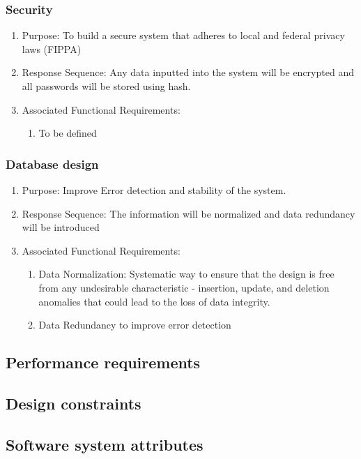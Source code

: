 \documentclass{journal}
\begin{document}
\begin{description}[style=multiline,leftmargin=3cm,font=\normalfont]
\subsubsection{Security}
\begin{enumerate}
\item Purpose: To build a secure system that adheres to local and federal privacy laws (FIPPA)
\item Response Sequence: Any data inputted into the system will be encrypted and all passwords will be stored using hash.
\item Associated Functional Requirements:
\begin{enumerate}
\item To be defined
\end{enumerate}
\end{enumerate}


\subsubsection{Database design}
\begin{enumerate}
\item Purpose: Improve Error detection and stability of the system.
\item Response Sequence: The information will be normalized and data redundancy will be introduced
\item Associated Functional Requirements:
\begin{enumerate}
\item Data Normalization: Systematic way to ensure that the design is free from any undesirable characteristic - insertion, update, and deletion anomalies that could lead to the loss of data integrity.
\item Data Redundancy to improve error detection
\end{enumerate}
\end{enumerate}
\subsection{Performance requirements}

\subsection{Design constraints}
\subsection{Software system attributes}

\end{description}
\end{document}
